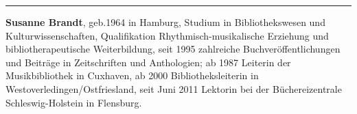 \begin{center}\rule{0.5\linewidth}{\linethickness}\end{center}

\textbf{Susanne Brandt}, geb.1964 in Hamburg, Studium in
Bibliothekswesen und Kulturwissenschaften, Qualifikation
Rhythmisch-musikalische Erziehung und bibliotherapeutische
Weiterbildung, seit 1995 zahlreiche Buchveröffentlichungen und Beiträge
in Zeitschriften und Anthologien; ab 1987 Leiterin der Musikbibliothek
in Cuxhaven, ab 2000 Bibliotheksleiterin in
Westoverledingen/Ostfriesland, seit Juni 2011 Lektorin bei der
Büchereizentrale Schleswig-Holstein in Flensburg.
